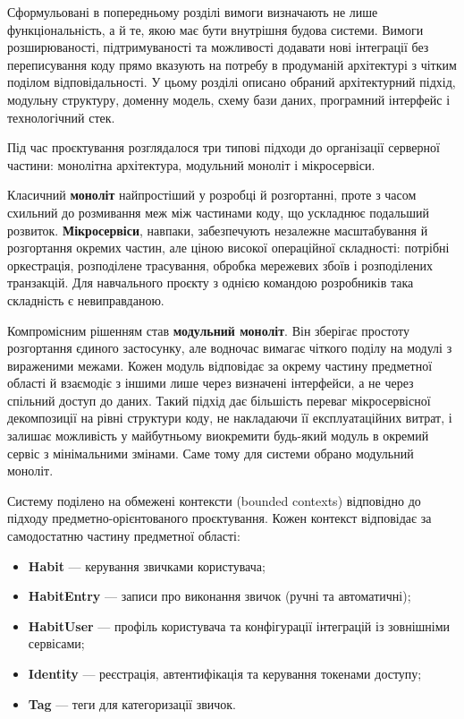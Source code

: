
Сформульовані в попередньому розділі вимоги визначають не лише функціональність, а й те, якою має бути внутрішня будова системи. Вимоги розширюваності, підтримуваності та можливості додавати нові інтеграції без переписування коду прямо вказують на потребу в продуманій архітектурі з чітким поділом відповідальності. У цьому розділі описано обраний архітектурний підхід, модульну структуру, доменну модель, схему бази даних, програмний інтерфейс і технологічний стек.


Під час проєктування розглядалося три типові підходи до організації серверної частини: монолітна архітектура, модульний моноліт і мікросервіси.

Класичний \textbf{моноліт} найпростіший у розробці й розгортанні, проте з часом схильний до розмивання меж між частинами коду, що ускладнює подальший розвиток. \textbf{Мікросервіси}, навпаки, забезпечують незалежне масштабування й розгортання окремих частин, але ціною високої операційної складності: потрібні оркестрація, розподілене трасування, обробка мережевих збоїв і розподілених транзакцій. Для навчального проєкту з однією командою розробників така складність є невиправданою.

Компромісним рішенням став \textbf{модульний моноліт}. Він зберігає простоту розгортання єдиного застосунку, але водночас вимагає чіткого поділу на модулі з вираженими межами. Кожен модуль відповідає за окрему частину предметної області й взаємодіє з іншими лише через визначені інтерфейси, а не через спільний доступ до даних. Такий підхід дає більшість переваг мікросервісної декомпозиції на рівні структури коду, не накладаючи її експлуатаційних витрат, і залишає можливість у майбутньому виокремити будь-який модуль в окремий сервіс з мінімальними змінами. Саме тому для системи обрано модульний моноліт.


Систему поділено на обмежені контексти (bounded contexts) відповідно до підходу предметно-орієнтованого проєктування. Кожен контекст відповідає за самодостатню частину предметної області:

\begin{itemize}[noitemsep, topsep=2pt, leftmargin=*]
    \item \textbf{Habit} — керування звичками користувача;
    \item \textbf{HabitEntry} — записи про виконання звичок (ручні та автоматичні);
    \item \textbf{HabitUser} — профіль користувача та конфігурації інтеграцій із зовнішніми сервісами;
    \item \textbf{Identity} — реєстрація, автентифікація та керування токенами доступу;
    \item \textbf{Tag} — теги для категоризації звичок.
\end{itemize}

